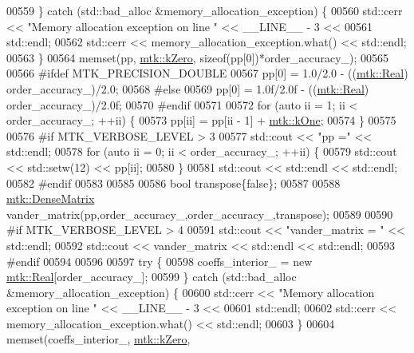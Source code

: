 \begin{DoxyCode}
{{00559   \} \textcolor{keywordflow}{catch} (std::bad\_alloc &memory\_allocation\_exception) \{
00560     std::cerr << \textcolor{stringliteral}{"Memory allocation exception on line "} << \_\_LINE\_\_ - 3 <<
00561       std::endl;
00562     std::cerr << memory\_allocation\_exception.what() << std::endl;
00563   \}
00564   memset(pp, \hyperlink{group__c01-roots_ga59a451a5fae30d59649bcda274fea271}{mtk::kZero}, \textcolor{keyword}{sizeof}(pp[0])*order\_accuracy\_);
00565 
00566 \textcolor{preprocessor}{  #ifdef MTK\_PRECISION\_DOUBLE}
00567   pp[0] = 1.0/2.0 - ((\hyperlink{group__c01-roots_gac080bbbf5cbb5502c9f00405f894857d}{mtk::Real}) order\_accuracy\_)/2.0;
00568 \textcolor{preprocessor}{  #else}
00569   pp[0] = 1.0f/2.0f - ((\hyperlink{group__c01-roots_gac080bbbf5cbb5502c9f00405f894857d}{mtk::Real}) order\_accuracy\_)/2.0f;
00570 \textcolor{preprocessor}{  #endif}
00571 
00572   \textcolor{keywordflow}{for} (\textcolor{keyword}{auto} ii = 1; ii < order\_accuracy\_; ++ii) \{
00573     pp[ii] = pp[ii - 1] + \hyperlink{group__c01-roots_ga26407c24d43b6b95480943340d285c71}{mtk::kOne};
00574   \}
00575 
00576 \textcolor{preprocessor}{  #if MTK\_VERBOSE\_LEVEL > 3}
00577   std::cout << \textcolor{stringliteral}{"pp ="} << std::endl;
00578   \textcolor{keywordflow}{for} (\textcolor{keyword}{auto} ii = 0; ii < order\_accuracy\_; ++ii) \{
00579     std::cout << std::setw(12) << pp[ii];
00580   \}
00581   std::cout << std::endl << std::endl;
00582 \textcolor{preprocessor}{  #endif}
00583 
00585 
00586   \textcolor{keywordtype}{bool} transpose\{\textcolor{keyword}{false}\};
00587 
00588   \hyperlink{classmtk_1_1DenseMatrix}{mtk::DenseMatrix} vander\_matrix(pp,order\_accuracy\_,order\_accuracy\_,transpose);
00589 
00590 \textcolor{preprocessor}{  #if MTK\_VERBOSE\_LEVEL > 4}
00591   std::cout << \textcolor{stringliteral}{"vander\_matrix = "} << std::endl;
00592   std::cout << vander\_matrix << std::endl << std::endl;
00593 \textcolor{preprocessor}{  #endif}
00594 
00596 
00597   \textcolor{keywordflow}{try} \{
00598     coeffs\_interior\_ = \textcolor{keyword}{new} \hyperlink{group__c01-roots_gac080bbbf5cbb5502c9f00405f894857d}{mtk::Real}[order\_accuracy\_];
00599   \} \textcolor{keywordflow}{catch} (std::bad\_alloc &memory\_allocation\_exception) \{
00600     std::cerr << \textcolor{stringliteral}{"Memory allocation exception on line "} << \_\_LINE\_\_ - 3 <<
00601       std::endl;
00602     std::cerr << memory\_allocation\_exception.what() << std::endl;
00603   \}
00604   memset(coeffs\_interior\_, \hyperlink{group__c01-roots_ga59a451a5fae30d59649bcda274fea271}{mtk::kZero},
}}
\end{DoxyCode}
